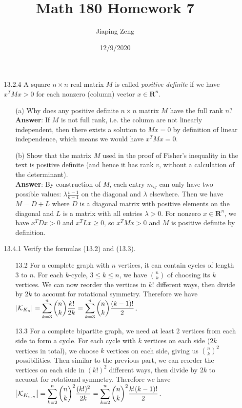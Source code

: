 \documentclass{article}
\title{Math 180 Homework 7}
\date{12/9/2020}
\author{Jiaping Zeng}
\begin{document}
\maketitle

\begin{itemize}
    \item [13.2.4] A square $n\times n$ real matrix $M$ is called \textit{positive definite} if we have $x^TMx>0$ for each nonzero (column) vector $x\in\mathbf{R}^n$.
          \begin{itemize}
              \item [(a)] Why does any positive definite $n\times n$ matrix $M$ have the full rank $n$?\\
                    \textbf{Answer}: If $M$ is not full rank, i.e. the column are not linearly independent, then there exists a solution to $Mx=0$ by definition of linear independence, which means we would have $x^TMx=0$.
              \item [(b)] Show that the matrix $M$ used in the proof of Fisher's inequality in the text is positive definite (and hence it has rank $v$, without a calculation of the determinant).\\
                    \textbf{Answer}: By construction of $M$, each entry $m_{ij}$ can only have two possible values: $\lambda\frac{v-1}{k-1}$ on the diagonal and $\lambda$ elsewhere. Then we have $M=D+L$ where $D$ is a diagonal matrix with positive elements on the diagonal and $L$ is a matrix with all entries $\lambda>0$. For nonzero $x\in\mathbf{R}^n$, we have $x^TDx>0$ and $x^TLx\geq 0$, so $x^TMx>0$ and $M$ is positive definite by definition.
          \end{itemize}
    \item [13.4.1] Verify the formulas (13.2) and (13.3).
          \begin{itemize}
              \item [13.2] For a complete graph with $n$ vertices, it can contain cycles of length 3 to $n$. For each $k$-cycle, $3\leq k\leq n$, we have $\binom{n}{k}$ of choosing its $k$ vertices. We can now reorder the vertices in $k!$ different ways, then divide by $2k$ to account for rotational symmetry. Therefore we have $\abs{\mathcal{K}_{K_n}}=\mathlarger{\sum_{k=3}^n\binom{n}{k}}\dfrac{k!}{2k}=\mathlarger{\sum_{k=3}^n\binom{n}{k}}\dfrac{(k-1)!}{2}$.
              \item [13.3] For a complete bipartite graph, we need at least 2 vertices from each side to form a cycle. For each cycle with $k$ vertices on each side ($2k$ vertices in total), we choose $k$ vertices on each side, giving us $\binom{n}{k}^2$ possibilities. Then similar to the previous part, we can reorder the vertices on each side in $(k!)^2$ different ways, then divide by $2k$ to accuont for rotational symmetry. Therefore we have $\abs{\mathcal{K}_{K_{n,n}}}=\mathlarger{\sum_{k=2}^n\binom{n}{k}^2}\dfrac{(k!)^2}{2k}=\mathlarger{\sum_{k=2}^n\binom{n}{k}^2}\dfrac{k!(k-1)!}{2}$.

\end{itemize}
\end{itemize}
\end{document}
